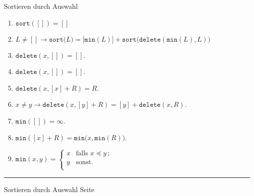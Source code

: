 \documentclass{slides}
\newcounter{mypage}
\begin{document}
\begin{slide}{}
\normalsize

\begin{center}
Sortieren durch Auswahl
\end{center}
\vspace*{0.5cm}

\footnotesize
\begin{enumerate}
\item $\mathtt{sort}([]) = []$
\item $L \not= [] \rightarrow \mathtt{sort}\bigl(L\bigr) = \bigl[\texttt{min}(L)\bigr]
      + \mathtt{sort}\bigl(\mathtt{delete}(\texttt{min}(L), L)\bigr)$
\item $\mathtt{delete}(x, []) = []$.
\item $\mathtt{delete}(x, []) = []$.
\item $\mathtt{delete}(x, [x] + R) = R$.
\item $x \not = y \rightarrow \mathtt{delete}(x, [y] + R) = [y] + \mathtt{delete}(x,R)$.
\item $\mathtt{min}([]) = \infty$.
\item $\mathtt{min}([x] + R) = \mathtt{min}\bigl(x, \mathtt{min}(R) \bigr)$. 
\item $\mathtt{min}(x,y) = \left\{
      \begin{array}{ll}
        x  & \mbox{falls $x \preceq y\,$;} \\
        y  & \mbox{sonst.} \\
      \end{array}\right.
      $
\end{enumerate}

\vspace*{\fill}
\tiny \addtocounter{mypage}{1}
\rule{17cm}{1mm}
Sortieren durch Auswahl \hspace*{\fill} Seite 
\end{slide}

\end{document}
